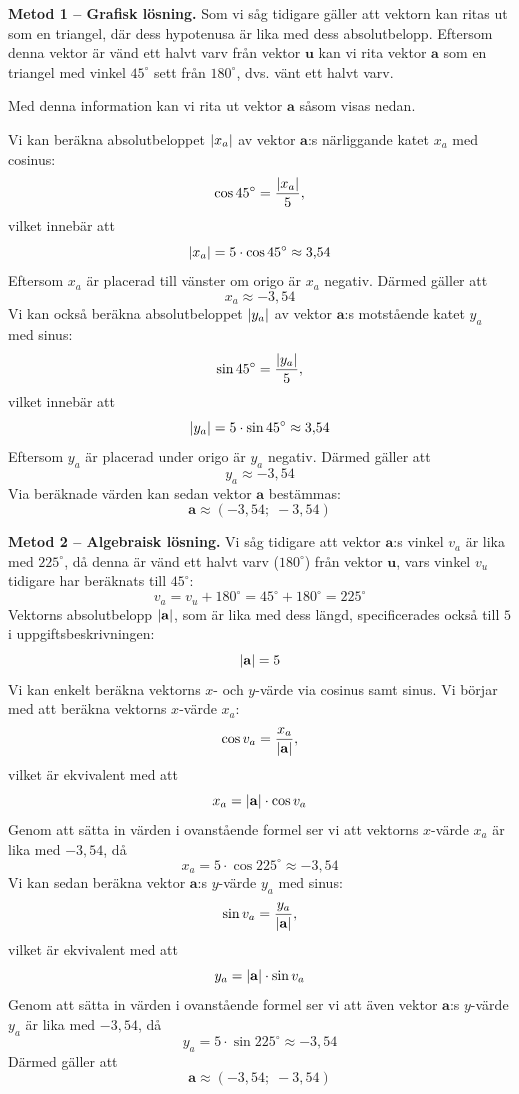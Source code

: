 \begin{exempel}
\textbf{Metod 1 -- Grafisk lösning.} Som vi såg tidigare gäller att vektorn kan ritas ut som en
triangel, där dess hypotenusa är lika med dess absolutbelopp. Eftersom denna vektor är vänd ett
halvt varv från vektor $\mathbf{u}$ kan vi rita vektor $\mathbf{a}$ som en triangel med vinkel
$45^{\circ}$ sett från $180^{\circ}$, dvs. vänt ett halvt varv.

Med denna information kan vi rita ut vektor $\mathbf{a}$ såsom visas nedan.


Vi kan beräkna absolutbeloppet $\lvert x_a\rvert$ av vektor $\mathbf{a}$:s närliggande katet $x_a$ med
cosinus:
\[
  \cos 45^{\circ} = \frac{\lvert x_a\rvert}{5},
\]
vilket innebär att
\[
  \lvert x_a\rvert = 5 \cdot \cos 45^{\circ} \approx 3{,}54
\]
Eftersom $x_a$ är placerad till vänster om origo är $x_a$ negativ. Därmed gäller att
\[
  x_a \approx -3{,}54
\]
Vi kan också beräkna absolutbeloppet $\lvert y_a\rvert$ av vektor $\mathbf{a}$:s motstående katet
$y_a$ med sinus:
\[
  \sin 45^{\circ} = \frac{\lvert y_a\rvert}{5},
\]
vilket innebär att
\[
  \lvert y_a\rvert = 5 \cdot \sin 45^{\circ} \approx 3{,}54
\]
Eftersom $y_a$ är placerad under origo är $y_a$ negativ. Därmed gäller att
\[
  y_a \approx -3{,}54
\]
Via beräknade värden kan sedan vektor $\mathbf{a}$ bestämmas:
\[
  \mathbf{a} \approx (-3{,}54;\; -3{,}54)
\]

\textbf{Metod 2 -- Algebraisk lösning.} Vi såg tidigare att vektor $\mathbf{a}$:s vinkel $v_a$
är lika med $225^{\circ}$, då denna är vänd ett halvt varv ($180^{\circ}$) från vektor
$\mathbf{u}$, vars vinkel $v_u$ tidigare har beräknats till $45^{\circ}$:
\[
  v_a = v_u + 180^{\circ} = 45^{\circ} + 180^{\circ} = 225^{\circ}
\]
Vektorns absolutbelopp $\lvert\mathbf{a}\rvert$, som är lika med dess längd, specificerades också till
$5$ i uppgiftsbeskrivningen:
\[
  \lvert\mathbf{a}\rvert = 5
\]
Vi kan enkelt beräkna vektorns $x$- och $y$-värde via cosinus samt sinus. Vi börjar med att
beräkna vektorns $x$-värde $x_a$:
\[
  \cos v_a = \frac{x_a}{\lvert\mathbf{a}\rvert},
\]
vilket är ekvivalent med att
\[
  x_a = \lvert\mathbf{a}\rvert \cdot \cos v_a
\]
Genom att sätta in värden i ovanstående formel ser vi att vektorns $x$-värde $x_a$ är lika med
$-3{,}54$, då
\[
  x_a = 5 \cdot \cos 225^{\circ} \approx -3{,}54
\]
Vi kan sedan beräkna vektor $\mathbf{a}$:s $y$-värde $y_a$ med sinus:
\[
  \sin v_a = \frac{y_a}{\lvert\mathbf{a}\rvert},
\]
vilket är ekvivalent med att
\[
  y_a = \lvert\mathbf{a}\rvert \cdot \sin v_a
\]
Genom att sätta in värden i ovanstående formel ser vi att även vektor $\mathbf{a}$:s $y$-värde
$y_a$ är lika med $-3{,}54$, då
\[
  y_a = 5 \cdot \sin 225^{\circ} \approx -3{,}54
\]
Därmed gäller att
\[
  \mathbf{a} \approx (-3{,}54;\; -3{,}54)
\]
\end{exempel}

